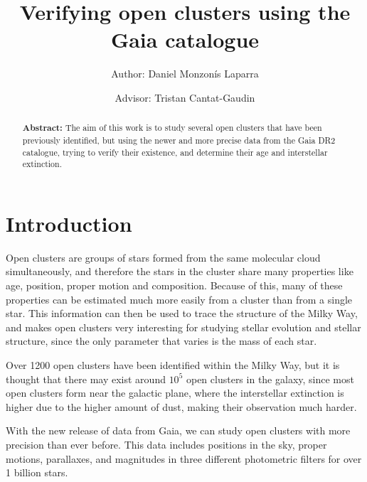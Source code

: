 \documentclass[twocolumn]{revtex4}
\begin{document}
\pagestyle{fancy}


\title{Verifying open clusters using the Gaia catalogue}
\author{Author: Daniel Monzonís Laparra}
\author{Advisor: Tristan Cantat-Gaudin}

\begin{abstract}
{\bf Abstract:} The aim of this work is to study several open clusters that have been previously identified, but using the newer and more precise data from the Gaia DR2 catalogue, trying to verify their existence, and determine their age and interstellar extinction.
\end{abstract}

\maketitle



\section{Introduction}
Open clusters are groups of stars formed from the same molecular cloud simultaneously, and therefore the stars in the cluster share many properties like age, position, proper motion and composition. Because of this, many of these properties can be estimated much more easily from a cluster than from a single star. This information can then be used to trace the structure of the Milky Way, and makes open clusters very interesting for studying stellar evolution and stellar structure, since the only parameter that varies is the mass of each star.

Over 1200 open clusters have been identified within the Milky Way, but it is thought that there may exist around $10^5$ open clusters in the galaxy, since most open clusters form near the galactic plane, where the interstellar extinction is higher due to the higher amount of dust, making their observation much harder.

With the new release of data from Gaia, we can study open clusters with more precision than ever before. This data includes positions in the sky, proper motions, parallaxes, and magnitudes in three different photometric filters for over 1 billion stars.
\end{document}
